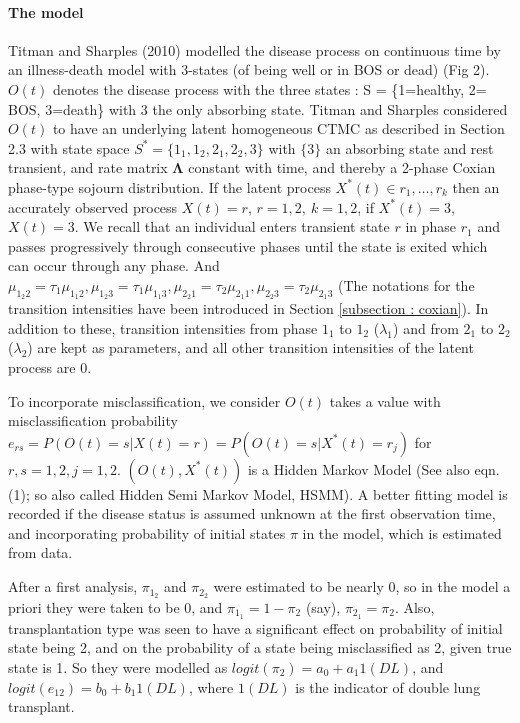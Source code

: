 \documentclass{uwstat572}
\begin{document}
\paragraph{The model} Titman and Sharples (2010) modelled the disease process on continuous time by an illness-death model with 3-states (of being well or in BOS or dead) (Fig 2). $O(t)$ denotes the disease process with the three states : S = \{1=healthy, 2= BOS, 3=death\} with $3$ the only absorbing state. Titman and Sharples considered $O(t)$ to have an underlying latent homogeneous CTMC as described in Section 2.3 with state space $S^*=\{1_1,1_2,2_1,2_2,3\}$ with $\{3\}$ an absorbing state and rest transient, and rate matrix $\bm{\Lambda}$ constant with time, and thereby a 2-phase Coxian phase-type sojourn distribution.  If the latent process $X^*(t) \in {r_1,\ldots, r_k}$ then an accurately observed process $X(t) = r$, $r=1,2,~k=1,2$, if $X^*(t)=3$, $X(t)=3$. We recall that an individual enters transient state $r$ in phase $r_1$ and passes progressively through consecutive phases until the state is exited which can occur through any phase. And $\mu_{1_2 2} = \tau_1 \mu_{1_1 2}, \mu_{1_2 3} = \tau_1 \mu_{1_1 3}, \mu_{2_2 1} = \tau_2 \mu_{2_1 1}, \mu_{2_2 3} = \tau_2 \mu_{2_1 3} $ (The notations for the transition intensities have been introduced in Section \ref{subsection : coxian}). In addition to these, transition intensities from phase $1_1$ to $1_{2}$ ($\lambda_1$) and from $2_1$ to $2_{2}$ ($\lambda_2$) are kept as parameters, and all other transition intensities of the latent process are $0$. 

To incorporate misclassification, we consider $O(t)$ takes a value with misclassification probability $e_{rs}=P(O(t)=s|X(t) =r)=P(O(t)=s|X^* (t) =r_j)$ for $r,s =1,2, j=1,2$. $(O(t), X^*(t))$ is a Hidden Markov Model (See also eqn. (1); so also called Hidden Semi Markov Model, HSMM). A better fitting model is recorded if the disease status is assumed unknown at the first observation time, and incorporating probability of initial states $\pi$ in the model, which is estimated from data.

After a first analysis, $\pi_{1_2}$ and $\pi_{2_2}$ were estimated to be nearly $0$, so in the model a priori they were taken to be $0$, and $\pi_{1_1}=1-\pi_2$ (say), $\pi_{2_1}=\pi_2$.  Also, transplantation type was seen to have a significant effect on probability of initial state being 2, and on the probability of a state being misclassified as 2, given true state is 1. So they were  modelled as $logit(\pi_2) = a_0 + a_1 1(DL)$, and $logit(e_{12})=b_0 + b_1 1(DL)$, where $1(DL)$ is the indicator of double lung transplant.
\end{document}
